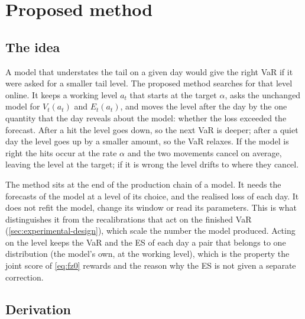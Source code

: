 \section{Proposed method}
\label{sec:proposed-method}

\subsection{The idea}
\label{sec:method-idea}

A model that understates the tail on a given day would give the right VaR if it were asked for a smaller tail level. The proposed method searches for that level online. It keeps a working level $a_t$ that starts at the target $\alpha$, asks the unchanged model for $V_t(a_t)$ and $E_t(a_t)$, and moves the level after the day by the one quantity that the day reveals about the model: whether the loss exceeded the forecast. After a hit the level goes down, so the next VaR is deeper; after a quiet day the level goes up by a smaller amount, so the VaR relaxes. If the model is right the hits occur at the rate $\alpha$ and the two movements cancel on average, leaving the level at the target; if it is wrong the level drifts to where they cancel.

The method sits at the end of the production chain of a model. It needs the forecasts of the model at a level of its choice, and the realised loss of each day. It does not refit the model, change its window or read its parameters. This is what distinguishes it from the recalibrations that act on the finished VaR (\cref{sec:experimental-design}), which scale the number the model produced. Acting on the level keeps the VaR and the ES of each day a pair that belongs to one distribution (the model's own, at the working level), which is the property the joint score of \cref{eq:fz0} rewards and the reason why the ES is not given a separate correction.

\subsection{Derivation}
\label{sec:method-derivation}

